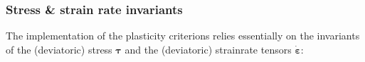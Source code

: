 %

\subsubsection{Stress \& strain rate invariants}\label{sec:stress_invariants}

The implementation of the plasticity criterions relies essentially 
on the invariants of the (deviatoric) stress ${\bm \tau}$ 
and the (deviatoric) strainrate tensors $\dot{\bm \varepsilon}$:

